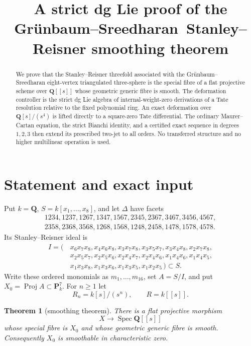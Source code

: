 \documentclass[11pt]{article}
\title{A strict dg Lie proof of the Gr\"unbaum--Sreedharan\
Stanley--Reisner smoothing theorem}
\author{}
\date{}
\newtheorem{theorem}{Theorem}[section]
\theoremstyle{definition}
\theoremstyle{remark}
\newcommand{\QQ}{\mathbf Q}
\newcommand{\PP}{\mathbf P}
\newcommand{\Spec}{\operatorname{Spec}}
\newcommand{\Proj}{\operatorname{Proj}}
\begin{document}
\maketitle

\begin{abstract}
We prove that the Stanley--Reisner threefold associated with the
Gr\"unbaum--Sreedharan eight-vertex triangulated three-sphere is the special
fibre of a flat projective scheme over $\QQ[[s]]$ whose geometric generic
fibre is smooth.  The deformation controller is the strict dg Lie algebra of
internal-weight-zero derivations of a Tate resolution relative to the fixed
polynomial ring.  An exact deformation over $\QQ[s]/(s^4)$ is lifted directly
to a square-zero Tate differential.  The ordinary Maurer--Cartan equation,
the strict Bianchi identity, and a certified exact sequence in degrees
$1,2,3$ then extend its prescribed two-jet to all orders.  No transferred
structure and no higher multilinear operation is used.
\end{abstract}

\tableofcontents

\section{Statement and exact input}

Put $k=\QQ$, $S=k[x_1,\ldots,x_8]$, and let $\Delta$ have facets
\[
\begin{gathered}
1234,1237,1267,1347,1567,2345,2367,3467,3456,4567,\\
2358,2368,3568,1268,1568,1248,2458,1478,1578,4578.
\end{gathered}
\]
Its Stanley--Reisner ideal is
\[
\begin{split}
I=(\,&x_6x_7x_8,x_4x_6x_8,x_3x_7x_8,x_3x_5x_7,
x_3x_4x_8,x_2x_7x_8,\\
&x_2x_5x_7,x_2x_5x_6,x_2x_4x_7,x_2x_4x_6,
x_1x_4x_6,x_1x_4x_5,\\
&x_1x_3x_8,x_1x_3x_6,x_1x_3x_5,x_1x_2x_5\,)\subset S.
\end{split}                                                    \tag{1.1}
\]
Write these ordered monomials as $m_1,\ldots,m_{16}$, set $A=S/I$, and put
$X_0=\Proj A\subset\PP^7_k$.  For $n\geq1$ let
\[
 R_n=k[s]/(s^n),\qquad R=k[[s]].
\]

\begin{theorem}[smoothing theorem]\label{thm:main}
There is a flat projective morphism
\[
 X\longrightarrow\Spec\QQ[[s]]
\]
whose special fibre is $X_0$ and whose geometric generic fibre is smooth.
Consequently $X_0$ is smoothable in characteristic zero.
\end{theorem}
\end{document}
